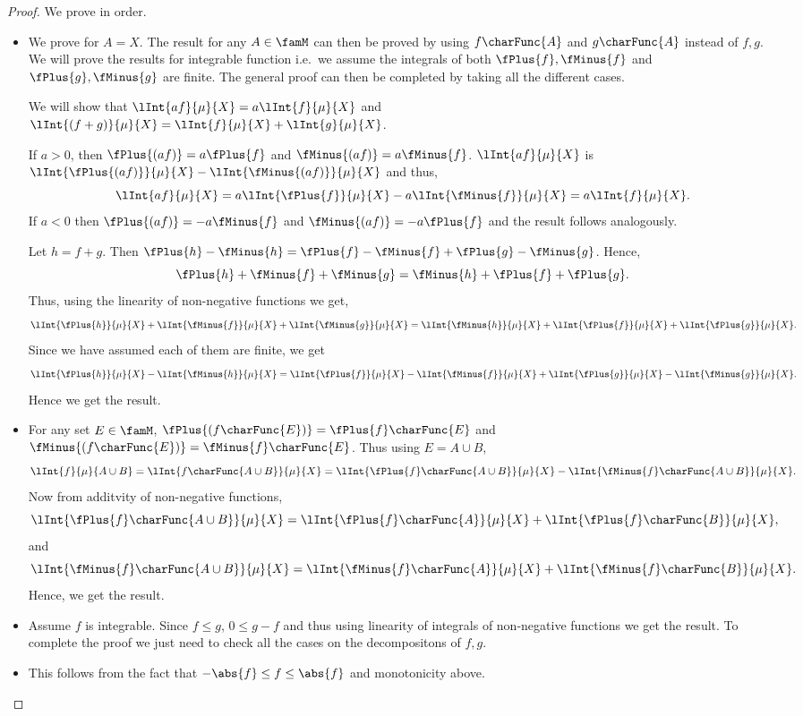 \begin{proof}
    We prove in order. 
    \begin{itemize}
	\item
	    We prove for $A = X$. The result for any $A \in \famM$ can then be
	    proved by using $f\charFunc{A}$ and $g\charFunc{A}$ instead of $f,g$.
	    We will
	    prove the results for integrable function i.e.~we assume the integrals of both 
	    $\fPlus{f},\fMinus{f}$ and $\fPlus{g},\fMinus{g}$ are 
	    finite. The general proof can then be completed by taking all the different cases.

	    We will show that 
	    $\lInt{af}{\mu}{X} = a\lInt{f}{\mu}{X}$ and \\ $\lInt{(f+g)}{\mu}{X} =
	    \lInt{f}{\mu}{X} + \lInt{g}{\mu}{X}$.

	    If $a > 0$, then $\fPlus{(af)} = a\fPlus{f}$ and $\fMinus{(af)} = a\fMinus{f}$. 
	    $\lInt{af}{\mu}{X}$ is $\lInt{\fPlus{(af)}}{\mu}{X} - \lInt{\fMinus{(af)}}{\mu}{X}$ and thus,
	    \[\lInt{af}{\mu}{X} = a\lInt{\fPlus{f}}{\mu}{X} - a\lInt{\fMinus{f}}{\mu}{X} = a\lInt{f}{\mu}{X}.\]
	    If $a < 0$ then $\fPlus{(af)} = -a\fMinus{f}$ and $\fMinus{(af)} = -a\fPlus{f}$ and the result
	    follows analogously.

	    Let $h = f+g$. Then $\fPlus{h} - \fMinus{h} = \fPlus{f} - \fMinus{f} + \fPlus{g} - \fMinus{g}$.
	    Hence,
	    \[\fPlus{h} + \fMinus{f} + \fMinus{g} = \fMinus{h} + \fPlus{f} + \fPlus{g}. \]
	    Thus, using the linearity of non-negative functions we get,
	    \[\lInt{\fPlus{h}}{\mu}{X} + \lInt{\fMinus{f}}{\mu}{X} + \lInt{\fMinus{g}}{\mu}{X} = 
		\lInt{\fMinus{h}}{\mu}{X} + \lInt{\fPlus{f}}{\mu}{X} + \lInt{\fPlus{g}}{\mu}{X}.\]
	    Since we have assumed each of them are finite, we get
	    \[\lInt{\fPlus{h}}{\mu}{X} - \lInt{\fMinus{h}}{\mu}{X} =  
		\lInt{\fPlus{f}}{\mu}{X} - \lInt{\fMinus{f}}{\mu}{X} + 
		\lInt{\fPlus{g}}{\mu}{X}- \lInt{\fMinus{g}}{\mu}{X}.\]
	    Hence we get the result.
	\item
	    For any set $E \in \famM$, $\fPlus{(f\charFunc{E})} = \fPlus{f}\charFunc{E}$ and
	    $\fMinus{(f\charFunc{E})} = \fMinus{f}\charFunc{E}$. Thus using $E = A\cup B$,
	    \[\lInt{f}{\mu}{A\cup B} = \lInt{f\charFunc{A\cup B}}{\mu}{X} = 
		\lInt{\fPlus{f}\charFunc{A\cup B}}{\mu}{X} - \lInt{\fMinus{f}\charFunc{A\cup B}}{\mu}{X}.\]
	    Now from additvity of non-negative functions,
	    \[\lInt{\fPlus{f}\charFunc{A\cup B}}{\mu}{X} = \lInt{\fPlus{f}\charFunc{A}}{\mu}{X} +  
		\lInt{\fPlus{f}\charFunc{B}}{\mu}{X},\]
	    and
	    \[\lInt{\fMinus{f}\charFunc{A\cup B}}{\mu}{X} = \lInt{\fMinus{f}\charFunc{A}}{\mu}{X} +  
		\lInt{\fMinus{f}\charFunc{B}}{\mu}{X}.\]
	    Hence, we get the result.
	\item
	    Assume $f$ is integrable. Since $f \leq g$, $0 \leq g - f$ and thus using linearity of integrals of 
	    non-negative functions we get the result. To complete the proof we just need to check all the
	    cases on the decompositons of $f,g$.
	\item
	    This follows from the fact that $-\abs{f} \leq f \leq \abs{f}$ and monotonicity above.
    \end{itemize}
\end{proof}
